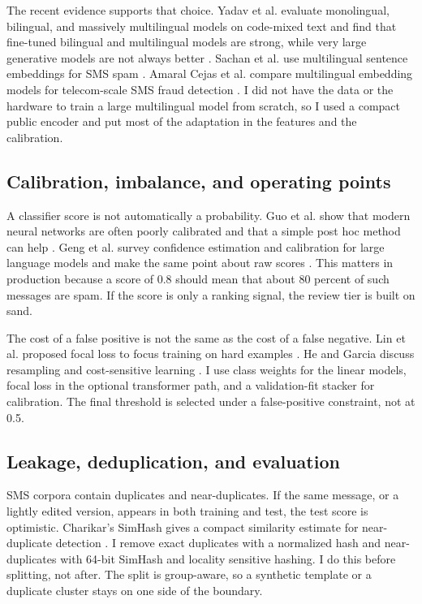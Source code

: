 \documentclass[11pt]{article}
\begin{document}
The recent evidence supports that choice. Yadav et al. evaluate monolingual, bilingual, and massively multilingual models on code-mixed text and find that fine-tuned bilingual and multilingual models are strong, while very large generative models are not always better \cite{yadav2024}. Sachan et al. use multilingual sentence embeddings for SMS spam \cite{sachan2025}. Amaral Cejas et al. compare multilingual embedding models for telecom-scale SMS fraud detection \cite{amaral2026}. I did not have the data or the hardware to train a large multilingual model from scratch, so I used a compact public encoder and put most of the adaptation in the features and the calibration.

\subsection{Calibration, imbalance, and operating points}

A classifier score is not automatically a probability. Guo et al. show that modern neural networks are often poorly calibrated and that a simple post hoc method can help \cite{guo2017}. Geng et al. survey confidence estimation and calibration for large language models and make the same point about raw scores \cite{geng2024}. This matters in production because a score of 0.8 should mean that about 80 percent of such messages are spam. If the score is only a ranking signal, the review tier is built on sand.

The cost of a false positive is not the same as the cost of a false negative. Lin et al. proposed focal loss to focus training on hard examples \cite{lin2017}. He and Garcia discuss resampling and cost-sensitive learning \cite{he2009}. I use class weights for the linear models, focal loss in the optional transformer path, and a validation-fit stacker for calibration. The final threshold is selected under a false-positive constraint, not at 0.5.

\subsection{Leakage, deduplication, and evaluation}

SMS corpora contain duplicates and near-duplicates. If the same message, or a lightly edited version, appears in both training and test, the test score is optimistic. Charikar's SimHash gives a compact similarity estimate for near-duplicate detection \cite{charikar2002}. I remove exact duplicates with a normalized hash and near-duplicates with 64-bit SimHash and locality sensitive hashing. I do this before splitting, not after. The split is group-aware, so a synthetic template or a duplicate cluster stays on one side of the boundary.
\end{document}
